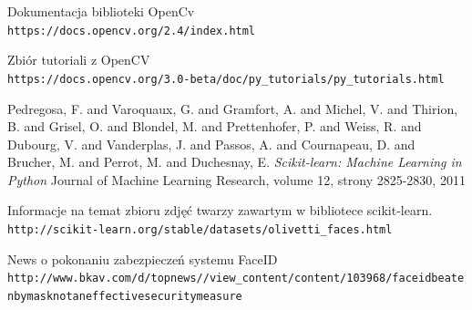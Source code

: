 \documentclass[oneside, eng]{mgr}
\begin{document}
\begin{thebibliography}{9}
Dokumentacja biblioteki OpenCv 
\\\texttt{https://docs.opencv.org/2.4/index.html}

Zbiór tutoriali z OpenCV
\\\texttt{https://docs.opencv.org/3.0-beta/doc/py\_tutorials/py\_tutorials.html}

Pedregosa, F. and Varoquaux, G. and Gramfort, A. and Michel, V.
         and Thirion, B. and Grisel, O. and Blondel, M. and Prettenhofer, P.
         and Weiss, R. and Dubourg, V. and Vanderplas, J. and Passos, A. and
         Cournapeau, D. and Brucher, M. and Perrot, M. and Duchesnay, E.
 \textit{Scikit-learn: Machine Learning in {P}ython}
 Journal of Machine Learning Research, volume 12, strony 2825-2830, 2011
 
Informacje na temat zbioru zdjęć twarzy zawartym w bibliotece scikit-learn.
\\\texttt{http://scikit-learn.org/stable/datasets/olivetti\_faces.html}

News o pokonaniu zabezpieczeń systemu FaceID
\\\texttt{http://www.bkav.com/d/top\-news/\-/view\_content/content/103968/face\-id\-beaten\-by\-mask\-not\-an\-effective\-security\-measure}

\end{thebibliography}

\tableofcontents

\listoffigures
\end{document}
